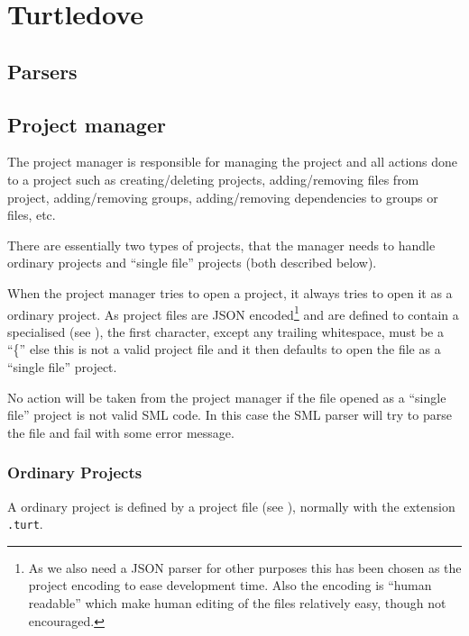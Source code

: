 

\section{Turtledove}
\label{sec:design-turtledove}


\subsection{Parsers}
\label{sec:design-parsers}


\subsection{Project manager}
\label{sec:design-project-manager}

The project manager is responsible for managing the project and all actions done
to a project such as creating/deleting projects, adding/removing files from
project, adding/removing groups, adding/removing dependencies to groups or
files, etc.


There are essentially two types of projects, that the manager needs to handle
ordinary projects and ``single file'' projects (both described below). 

When the project manager tries to open a project, it always tries to open it as
a ordinary project. As project files are JSON encoded\footnote{As we also need a
  JSON parser for other purposes this has been chosen as the project encoding to
  ease development time. Also the encoding is ``human readable'' which make
  human editing of the files relatively easy, though not encouraged.} and are
defined to contain a specialised  (see
), the first character, except any trailing whitespace,
must be a ``\{'' else this is not a valid project file and it then defaults to
open the file as a ``single file'' project.

No action will be taken from the project manager if the file opened as a
``single file'' project is not valid SML code. In this case the SML parser will
try to parse the file and fail with some error message.

\subsubsection{Ordinary Projects}

A ordinary project is defined by a project file (see
), normally with the extension \texttt{.turt}.
  

